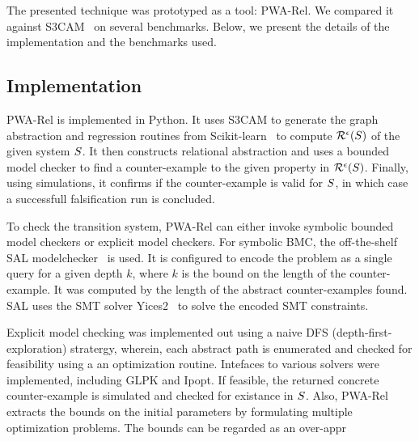 The presented technique was prototyped as a tool: PWA-Rel.  We
compared it against S3CAM~\cite{zutshi2014multiple} on several
benchmarks. Below, we present the details of the implementation and
the benchmarks used.

\subsection{Implementation}

PWA-Rel is implemented in Python. It uses S3CAM to generate the graph
abstraction and regression routines from
Scikit-learn~\cite{pedregosa2011scikit} to compute
$\mathcal{R}^{\epsilon}(S)$ of the given system $S$.
It then constructs relational abstraction and uses a bounded model
checker to find a counter-example to the given property in
$\mathcal{R}^{\epsilon}(S)$. Finally, using simulations, it
confirms if the counter-example is valid for $S$, in which case
a successfull falsification run is concluded.

To check the transition system, PWA-Rel can either invoke symbolic
bounded model checkers or explicit model checkers. For symbolic BMC,
the off-the-shelf SAL modelchecker~\cite{SAL-SRI} is used. It is
configured to encode the problem as a single query for a given depth
$k$, where $k$ is the bound on the length of the counter-example. It
was computed by the length of the abstract counter-examples found. SAL
uses the SMT solver Yices2~\cite{dutertre2014yices} to solve the
encoded SMT constraints.


Explicit model checking was implemented out using a naive DFS
(depth-first-exploration) stratergy, wherein, each abstract path is
enumerated and checked for feasibility using a an optimization
routine. Intefaces to various solvers were implemented, including GLPK
and Ipopt. If feasible, the returned concrete counter-example is
simulated and checked for existance in $S$. Also, PWA-Rel
extracts the bounds on the initial parameters by formulating multiple
optimization problems. The bounds can be regarded as an over-appr

